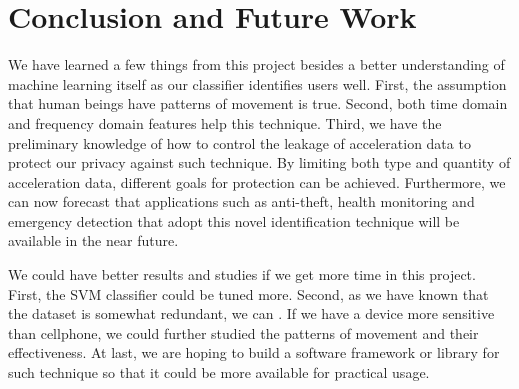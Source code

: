 \documentclass{article} %
\begin{document}
\section{Conclusion and Future Work}


We have learned a few things from this project besides a better understanding of machine learning itself as our classifier identifies users well. First, the assumption that human beings have patterns of movement is true. Second, both time domain and frequency domain features help this technique. Third, we have the preliminary knowledge of how to control the leakage of acceleration data to protect our privacy against such technique. By limiting both type and quantity of acceleration data, different goals for protection can be achieved. Furthermore, we can now forecast that applications such as anti-theft, health monitoring and emergency detection that adopt this novel identification technique will be available in the near future.

We could have better results and studies if we get more time in this project. First, the SVM classifier could be tuned more. Second, as we have known that the dataset is somewhat redundant, we can . If we have a device more sensitive than cellphone, we could further studied the patterns of movement and their effectiveness. At last, we are hoping to build a software framework or library for such technique so that it could be more available for practical usage.




\end{document}
